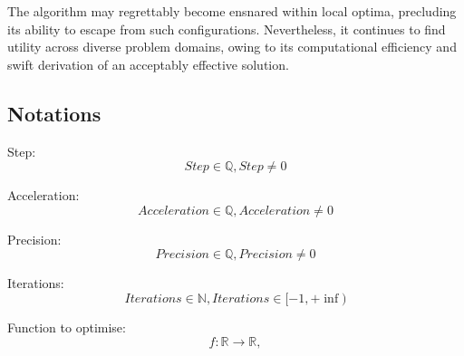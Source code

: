 \documentclass[conference]{IEEEtran}
\begin{document}
The algorithm may regrettably become ensnared within local optima, precluding its ability to escape from such configurations.
Nevertheless, it continues to find utility across diverse problem domains, owing to its computational efficiency and swift derivation of an acceptably effective solution.

\subsection{Notations}
Step:
\begin{equation} Step \in \mathbb{Q}, Step \ne 0 \end{equation}

Acceleration:
\begin{equation} Acceleration \in \mathbb{Q}, Acceleration \ne 0 \end{equation}

Precision:
\begin{equation} Precision \in \mathbb{Q}, Precision \ne 0 \end{equation}

Iterations:
\begin{equation} Iterations \in \mathbb{N}, Iterations \in [-1, +\inf) \end{equation}

Function to optimise:
\begin{equation} f : \mathbb{R} \rightarrow \mathbb{R},  \end{equation}
\end{document}
